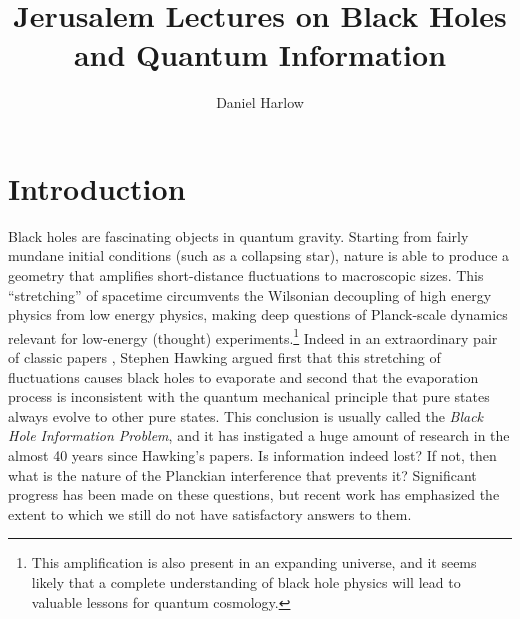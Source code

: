 \documentclass[12pt]{article}
\begin{document}
\title{Jerusalem Lectures on Black Holes and Quantum Information}
\author[a]{Daniel Harlow}

\maketitle

\newpage

\section{Introduction}
Black holes are fascinating objects in quantum gravity.  Starting from fairly mundane initial conditions (such as a collapsing star), nature is able to produce a geometry that amplifies short-distance fluctuations to macroscopic sizes.  This ``stretching'' of spacetime circumvents the Wilsonian decoupling of high energy physics from low energy physics, making deep questions of Planck-scale dynamics  relevant for low-energy (thought) experiments.\footnote{This amplification is also present in an expanding universe, and it seems likely that a complete understanding of black hole physics will lead to valuable lessons for quantum cosmology.}  Indeed in an extraordinary pair of classic papers \cite{Hawking:1974sw,Hawking:1976ra}, Stephen Hawking argued first that this stretching of fluctuations causes black holes to evaporate and second that the evaporation process is inconsistent with the quantum mechanical principle that pure states always evolve to other pure states.  This conclusion is usually called the \textit{Black Hole Information Problem}, and it has instigated a huge amount of research in the almost 40 years since Hawking's papers.  Is information indeed lost?  If not, then what is the nature of the Planckian interference that prevents it?  Significant progress has been made on these questions, but recent work has emphasized the extent to which we still do not have satisfactory answers to them.  
\end{document}
